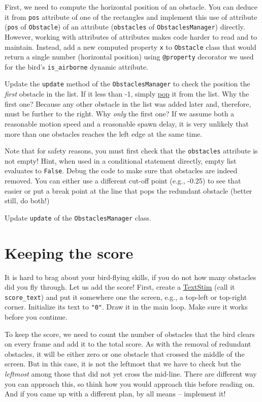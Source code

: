 \documentclass[
]{book}
\begin{document}
First, we need to compute the horizontal position of an obstacle. You can deduce it from \texttt{pos} attribute of one of the rectangles and implement this use of attribute (\texttt{pos} of \texttt{Obstacle}) of an attribute (\texttt{obstacles} of \texttt{ObstaclesManager}) directly. However, working with attributes of attributes makes code harder to read and to maintain. Instead, add a new computed property \texttt{x} to \texttt{Obstacle} class that would return a single number (horizontal position) using \texttt{@property} decorator we used for the bird's \texttt{is\_airborne} dynamic attribute.

Update the \texttt{update} method of the \texttt{ObstaclesManager} to check the position the \emph{first} obstacle in the list. If it less than -1, simply \href{https://docs.python.org/3.1/tutorial/datastructures.html}{pop} it from the list. Why the first one? Because any other obstacle in the list was added later and, therefore, must be further to the right. Why \emph{only} the first one? If we assume both a reasonable motion speed and a reasonable spawn delay, it is very unlikely that more than one obstacles reaches the left edge at the same time.

Note that for safety reasons, you must first check that the \texttt{obstacles} attribute is not empty! Hint, when used in a conditional statement directly, empty list evaluates to \texttt{False}. Debug the code to make sure that obstacles are indeed removed. You can either use a different cut-off point (e.g., -0.25) to see that easier or put a break point at the line that pops the redundant obstacle (better still, do both!)

Update \texttt{update} of the \texttt{ObstaclesManager} class.

\hypertarget{keeping-the-score}{%
\section{Keeping the score}\label{keeping-the-score}}

It is hard to brag about your bird-flying skills, if you do not how many obstacles did you fly through. Let us add the score! First, create a \href{https://psychopy.org/api/visual/textstim.html\#psychopy.visual.TextStim}{TextStim} (call it \texttt{score\_text}) and put it somewhere one the screen, e.g., a top-left or top-right corner. Initialize its text to \texttt{"0"}. Draw it in the main loop. Make sure it works before you continue.

To keep the score, we need to count the number of obstacles that the bird clears on every frame and add it to the total score. As with the removal of redundant obstacles, it will be either zero or one obstacle that crossed the middle of the screen. But in this case, it is not the leftmost that we have to check but the \emph{leftmost} among those that did not yet cross the mid-line. There are different way you can approach this, so think how you would approach this before reading on. And if you came up with a different plan, by all means -- implement it!
\end{document}
